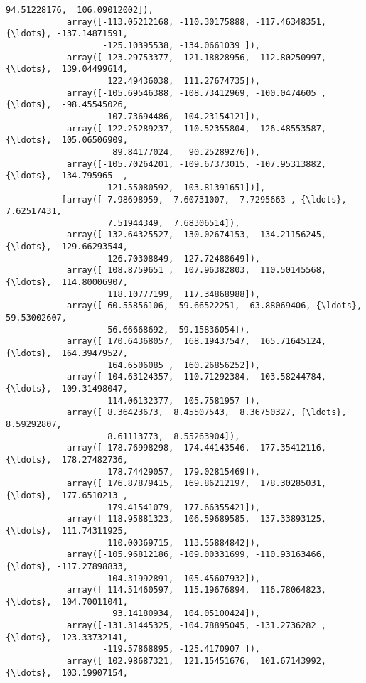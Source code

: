 \documentclass[11pt]{article}
\begin{document}
\begin{Verbatim}[commandchars=\\\{\}]
                     94.51228176,  106.09012002]),
            array([-113.05212168, -110.30175888, -117.46348351, {\ldots}, -137.14871591,
                   -125.10395538, -134.0661039 ]),
            array([ 123.29753377,  121.18828956,  112.80250997, {\ldots},  139.04499614,
                    122.49436038,  111.27674735]),
            array([-105.69546388, -108.73412969, -100.0474605 , {\ldots},  -98.45545026,
                   -107.73694486, -104.23154121]),
            array([ 122.25289237,  110.52355804,  126.48553587, {\ldots},  105.06506909,
                     89.84177024,   90.25289276]),
            array([-105.70264201, -109.67373015, -107.95313882, {\ldots}, -134.795965  ,
                   -121.55080592, -103.81391651])],
           [array([ 7.98698959,  7.60731007,  7.7295663 , {\ldots},  7.62517431,
                    7.51944349,  7.68306514]),
            array([ 132.64325527,  130.02674153,  134.21156245, {\ldots},  129.66293544,
                    126.70308849,  127.72488649]),
            array([ 108.8759651 ,  107.96382803,  110.50145568, {\ldots},  114.80006907,
                    118.10777199,  117.34868988]),
            array([ 60.55856106,  59.66522251,  63.88069406, {\ldots},  59.53002607,
                    56.66668692,  59.15836054]),
            array([ 170.64368057,  168.19437547,  165.71645124, {\ldots},  164.39479527,
                    164.6506085 ,  160.26856252]),
            array([ 104.63124357,  110.71292384,  103.58244784, {\ldots},  109.31498047,
                    114.06132377,  105.7581957 ]),
            array([ 8.36423673,  8.45507543,  8.36750327, {\ldots},  8.59292807,
                    8.61113773,  8.55263904]),
            array([ 178.76998298,  174.44143546,  177.35412116, {\ldots},  178.27482736,
                    178.74429057,  179.02815469]),
            array([ 176.87879415,  169.86212197,  178.30285031, {\ldots},  177.6510213 ,
                    179.41541079,  177.66355421]),
            array([ 118.95881323,  106.59689585,  137.33893125, {\ldots},  111.74311925,
                    110.00369715,  113.55884842]),
            array([-105.96812186, -109.00331699, -110.93163466, {\ldots}, -117.27898833,
                   -104.31992891, -105.45607932]),
            array([ 114.51460597,  115.19676894,  116.78064823, {\ldots},  104.70011041,
                     93.14180934,  104.05100424]),
            array([-131.31445325, -104.78895045, -131.2736282 , {\ldots}, -123.33732141,
                   -119.57868895, -125.4170907 ]),
            array([ 102.98687321,  121.15451676,  101.67143992, {\ldots},  103.19907154,

\end{Verbatim}
\end{document}
